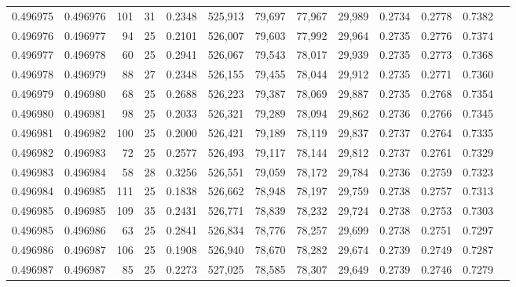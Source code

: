 \begin{tabular}{rrrrrrrrrrrrr}
0.496975 & 0.496976 & 101 &  31 &                                     0.2348 & 525,913 &  79,697 &  77,967 &  29,989 & 0.2734 & 0.2778 & 0.7382 \\
0.496976 & 0.496977 &  94 &  25 &                                     0.2101 & 526,007 &  79,603 &  77,992 &  29,964 & 0.2735 & 0.2776 & 0.7374 \\
0.496977 & 0.496978 &  60 &  25 &                                     0.2941 & 526,067 &  79,543 &  78,017 &  29,939 & 0.2735 & 0.2773 & 0.7368 \\
0.496978 & 0.496979 &  88 &  27 &                                     0.2348 & 526,155 &  79,455 &  78,044 &  29,912 & 0.2735 & 0.2771 & 0.7360 \\
0.496979 & 0.496980 &  68 &  25 &                                     0.2688 & 526,223 &  79,387 &  78,069 &  29,887 & 0.2735 & 0.2768 & 0.7354 \\
0.496980 & 0.496981 &  98 &  25 &                                     0.2033 & 526,321 &  79,289 &  78,094 &  29,862 & 0.2736 & 0.2766 & 0.7345 \\
0.496981 & 0.496982 & 100 &  25 &                                     0.2000 & 526,421 &  79,189 &  78,119 &  29,837 & 0.2737 & 0.2764 & 0.7335 \\
0.496982 & 0.496983 &  72 &  25 &                                     0.2577 & 526,493 &  79,117 &  78,144 &  29,812 & 0.2737 & 0.2761 & 0.7329 \\
0.496983 & 0.496984 &  58 &  28 &                                     0.3256 & 526,551 &  79,059 &  78,172 &  29,784 & 0.2736 & 0.2759 & 0.7323 \\
0.496984 & 0.496985 & 111 &  25 &                                     0.1838 & 526,662 &  78,948 &  78,197 &  29,759 & 0.2738 & 0.2757 & 0.7313 \\
0.496985 & 0.496985 & 109 &  35 &                                     0.2431 & 526,771 &  78,839 &  78,232 &  29,724 & 0.2738 & 0.2753 & 0.7303 \\
0.496985 & 0.496986 &  63 &  25 &                                     0.2841 & 526,834 &  78,776 &  78,257 &  29,699 & 0.2738 & 0.2751 & 0.7297 \\
0.496986 & 0.496987 & 106 &  25 &                                     0.1908 & 526,940 &  78,670 &  78,282 &  29,674 & 0.2739 & 0.2749 & 0.7287 \\
0.496987 & 0.496987 &  85 &  25 &                                     0.2273 & 527,025 &  78,585 &  78,307 &  29,649 & 0.2739 & 0.2746 & 0.7279 \\

\end{tabular}
